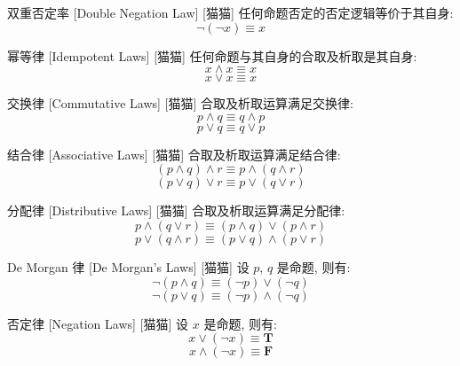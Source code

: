 \documentclass[UTF8]{ctexart}
\newcommand{\LT}{\ensuremath{\mathbf{T}}}
\newcommand{\LF}{\ensuremath{\mathbf{F}}}
\begin{document}
            \begin{ppt}
                []
                {双重否定率}
                [Double Negation Law]
                [猫猫]
                任何命题否定的否定逻辑等价于其自身: 
                \[\neg(\neg x)\equiv x\]
            \end{ppt}

            \begin{ppt}
                []
                {幂等律}
                [Idempotent Laws]
                [猫猫]
                任何命题与其自身的合取及析取是其自身: 
                \[x\land x\equiv x\]
                \[x\lor x\equiv x\]
            \end{ppt}

            \begin{ppt}
                []
                {交换律}
                [Commutative Laws]
                [猫猫]
                合取及析取运算满足交换律: 
                \[p\land q\equiv q\land p\]
                \[p\lor q\equiv q\lor p\]
            \end{ppt}

            \begin{ppt}
                []
                {结合律}
                [Associative Laws]
                [猫猫]
                合取及析取运算满足结合律: 
                \[(p\land q)\land r\equiv p\land(q\land r)\]
                \[(p\lor q)\lor r\equiv p\lor(q\lor r)\]
            \end{ppt}

            \begin{ppt}
                []
                {分配律}
                [Distributive Laws]
                [猫猫]
                合取及析取运算满足分配律: 
                \[p\land(q\lor r)\equiv(p\land q)\lor(p\land r)\]
                \[p\lor(q\land r)\equiv(p\lor q)\land(p\lor r)\]
            \end{ppt}

            \begin{ppt}
                []
                {De Morgan 律}
                [De Morgan's Laws]
                [猫猫]
                设 \(p\), \(q\) 是命题, 则有: 
                \[\neg(p\land q)\equiv(\neg p)\lor(\neg q)\]
                \[\neg(p\lor q)\equiv(\neg p)\land(\neg q)\]
            \end{ppt}

            \begin{ppt}
                []
                {否定律}
                [Negation Laws]
                [猫猫]
                设 \(x\) 是命题, 则有: 
                \[x \lor (\neg x)\equiv \LT\]
                \[x \land (\neg x)\equiv \LF\]
            \end{ppt}
\end{document}
